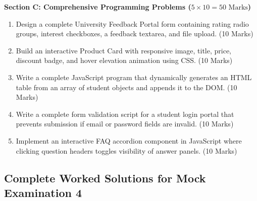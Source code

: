 \begin{mockexam}
\medskip
\noindent\textbf{Section C: Comprehensive Programming Problems ($5 \times 10 = 50\text{ Marks}$)}
\begin{enumerate}[leftmargin=1.5em, start=17]
    \item Design a complete University Feedback Portal form containing rating radio groups, interest checkboxes, a feedback textarea, and file upload. (10 Marks)
    \item Build an interactive Product Card with responsive image, title, price, discount badge, and hover elevation animation using CSS. (10 Marks)
    \item Write a complete JavaScript program that dynamically generates an HTML table from an array of student objects and appends it to the DOM. (10 Marks)
    \item Write a complete form validation script for a student login portal that prevents submission if email or password fields are invalid. (10 Marks)
    \item Implement an interactive FAQ accordion component in JavaScript where clicking question headers toggles visibility of answer panels. (10 Marks)
\end{enumerate}
\end{mockexam}

\subsection{Complete Worked Solutions for Mock Examination 4}

